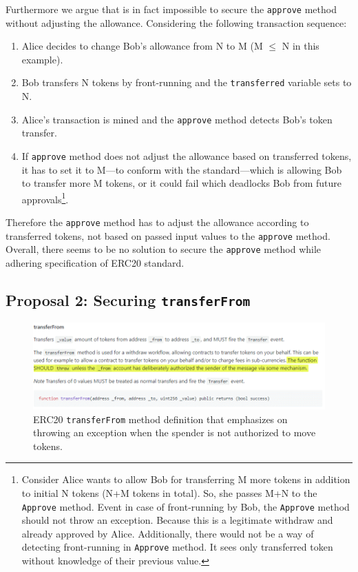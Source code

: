 Furthermore we argue that is in fact impossible to secure the \texttt{approve} method without adjusting the allowance. Considering the following transaction sequence:

\begin{enumerate}
	\item Alice decides to change Bob's allowance from N to M (M $\leq$ N in this example).
	\item Bob transfers N tokens by front-running and the \texttt{transferred} variable sets to N.
	\item Alice's transaction is mined and the \texttt{approve} method detects Bob's token transfer.
	\item If \texttt{approve} method does not adjust the allowance based on transferred tokens, it has to set it to M---to conform with the standard---which is allowing Bob to transfer more M tokens, or it could fail which deadlocks Bob from future approvals\footnote{Consider Alice wants to allow Bob for transferring M more tokens in addition to initial N tokens (N+M tokens in total). So, she passes M+N to the \texttt{Approve} method. Event in case of front-running by Bob, the \texttt{Approve} method should not throw an exception. Because this is a legitimate withdraw and already approved by Alice. Additionally, there would not be a way of detecting front-running in \texttt{Approve} method. It sees only transferred token without knowledge of their previous value.}.
\end{enumerate}

Therefore the \texttt{approve} method has to adjust the allowance according to transferred tokens, not based on passed input values to the \texttt{approve} method. Overall, there seems to be no solution to secure the \texttt{approve} method while adhering specification of ERC20 standard.



\subsection{Proposal 2: Securing \texttt{transferFrom}}\label{sec:proposal2}

\begin{figure}[t]
	\centering
	\includegraphics[width=1.0\linewidth]{figures/multiple_withdrawal_30.png}
	\caption{ERC20 \texttt{transferFrom} method definition that emphasizes on throwing an exception when the spender is not authorized to move tokens.\label{fig:standard}}
\end{figure}

